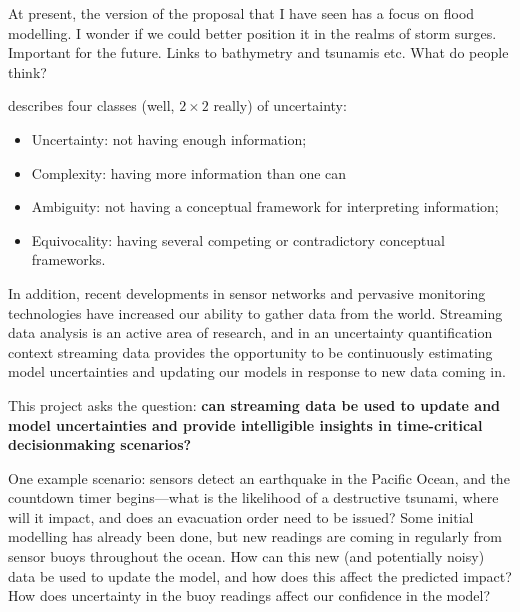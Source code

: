 \documentclass[a4paper,fontsize=12pt]{scrartcl}
\begin{document}
At present, the version of the proposal that I have seen has a focus
on flood modelling. I wonder if we could better position it in the
realms of storm surges. Important for the future. Links to bathymetry
and tsunamis etc. What do people think?




\textcite{zack_role_2007} describes four classes (well, $2\times2$ really) of uncertainty:
\begin{itemize}
\item Uncertainty: not having enough information;
\item Complexity: having more information than one can
\item Ambiguity: not having a conceptual framework for interpreting
  information;
\item Equivocality: having several competing or contradictory
  conceptual frameworks.
\end{itemize}

In addition, recent developments in sensor networks and pervasive
monitoring technologies have increased our ability to gather data from
the world. Streaming data analysis is an active area of research, and
in an uncertainty quantification context streaming data provides the
opportunity to be continuously estimating model uncertainties and
updating our models in response to new data coming in.

This project asks the question: \textbf{can streaming data be used to
  update and model uncertainties and provide intelligible insights in
  time-critical decisionmaking scenarios?}

One example scenario: sensors detect an earthquake in the Pacific Ocean,
and the countdown timer begins---what is the likelihood of a
destructive tsunami, where will it impact, and does an evacuation
order need to be issued? Some initial modelling has already been done,
but new readings are coming in regularly from sensor buoys throughout
the ocean. How can this new (and potentially noisy) data be used to
update the model, and how does this affect the predicted impact? How
does uncertainty in the buoy readings affect our confidence in the
model?
\end{document}
